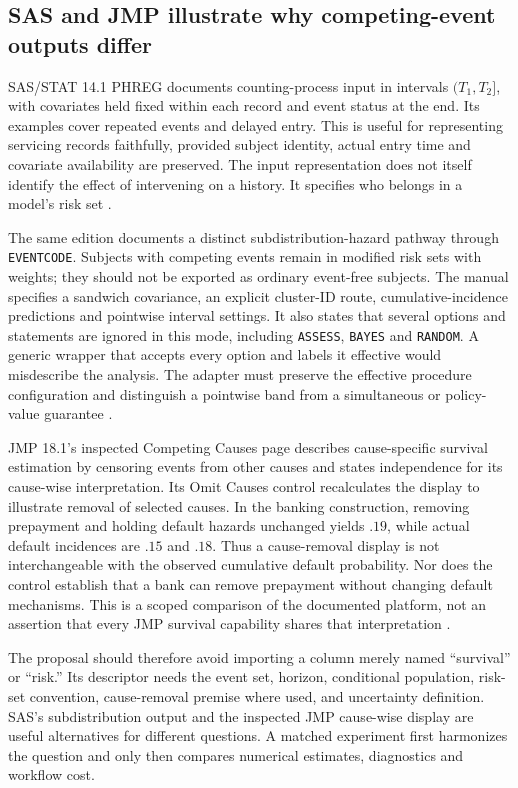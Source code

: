 \subsection{SAS and JMP illustrate why competing-event outputs differ}

SAS/STAT 14.1 PHREG documents counting-process input in intervals $(T_1,T_2]$,
with covariates held fixed within each record and event status at the end.
Its examples cover repeated events and delayed entry. This is useful for
representing servicing records faithfully, provided subject identity, actual
entry time and covariate availability are preserved. The input representation
does not itself identify the effect of intervening on a history. It specifies
who belongs in a model's risk set \citep{exec14_survival_sas}.

The same edition documents a distinct subdistribution-hazard pathway through
\texttt{EVENTCODE}. Subjects with competing events remain in modified risk
sets with weights; they should not be exported as ordinary event-free subjects.
The manual specifies a sandwich covariance, an explicit cluster-ID route,
cumulative-incidence predictions and pointwise interval settings. It also
states that several options and statements are ignored in this mode, including
\texttt{ASSESS}, \texttt{BAYES} and \texttt{RANDOM}. A generic wrapper that
accepts every option and labels it effective would misdescribe the analysis.
The adapter must preserve the effective procedure configuration and distinguish
a pointwise band from a simultaneous or policy-value guarantee
\citep{exec14_survival_sas}.

JMP 18.1's inspected Competing Causes page describes cause-specific survival
estimation by censoring events from other causes and states independence for
its cause-wise interpretation. Its Omit Causes control recalculates the
display to illustrate removal of selected causes. In the banking construction,
removing prepayment and holding default hazards unchanged yields $.19$, while
actual default incidences are $.15$ and $.18$. Thus a cause-removal display
is not interchangeable with the observed cumulative default probability.
Nor does the control establish that a bank can remove prepayment without
changing default mechanisms. This is a scoped comparison of the documented
platform, not an assertion that every JMP survival capability shares that
interpretation \citep{exec14_survival_jmp,exec14_survival_exact}.

The proposal should therefore avoid importing a column merely named
``survival'' or ``risk.'' Its descriptor needs the event set, horizon,
conditional population, risk-set convention, cause-removal premise where
used, and uncertainty definition. SAS's subdistribution output and the
inspected JMP cause-wise display are useful alternatives for different
questions. A matched experiment first harmonizes the question and only then
compares numerical estimates, diagnostics and workflow cost.

